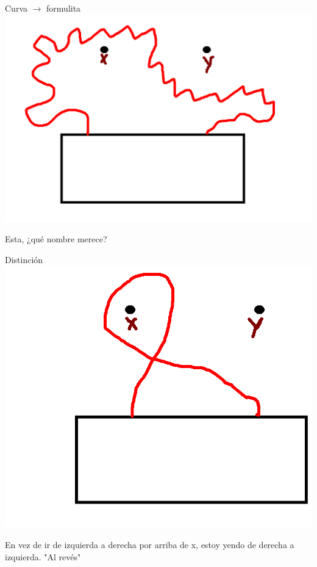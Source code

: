 \documentclass[11pt]{beamer}
\begin{document}
\begin{frame}{Curva $\rightarrow$ formulita}
	\includegraphics[scale=0.35]{images/x_v2.png}
	
	
	Esta, ¿qué nombre merece?

	
\end{frame}

\begin{frame}{Distinción}
	\includegraphics[scale=0.30]{images/x-1.png}

	En vez de ir de izquierda a derecha por arriba de x, estoy yendo de derecha a izquierda. "Al revés" 	\visible<2->{\color{red} \center{\Huge{$x$}\LARGE$^{-1}$}}
	
\end{frame}
\end{document}
